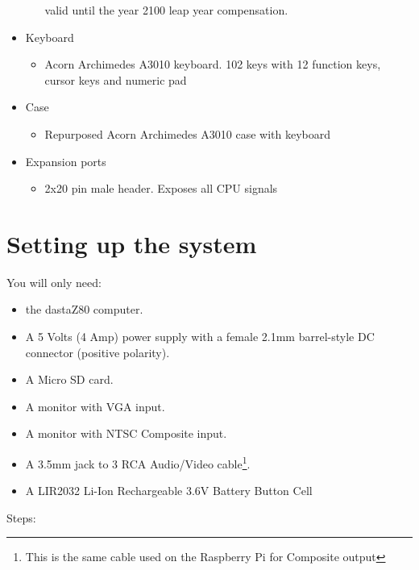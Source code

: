 \documentclass[a4paper,11pt]{article}
\begin{document}
\begin{itemize}
\begin{itemize}
            valid until the year 2100 leap year compensation.
        \end{itemize}
        \item Keyboard
        \begin{itemize}
            \item Acorn Archimedes A3010 keyboard. 102 keys with 12 function
            keys, cursor keys and numeric pad
        \end{itemize}
        \item Case
        \begin{itemize}
            \item Repurposed Acorn Archimedes A3010 case with keyboard
        \end{itemize}
        \item Expansion ports
        \begin{itemize}
            \item 2x20 pin male header. Exposes all CPU signals
        \end{itemize}
    \end{itemize}

    \pagebreak
    \section{Setting up the system}
    You will only need:

    \begin{itemize}
        \item the dastaZ80 computer.
        \item A 5 Volts (4 Amp) power supply with a female 2.1mm barrel-style DC
        connector (positive polarity).
        \item A Micro SD card.
        \item A monitor with VGA input.
        \item A monitor with NTSC Composite input.
        \item A 3.5mm jack to 3 RCA Audio/Video cable\footnote{This is the same
        cable used on the Raspberry Pi for Composite output}.
        \item A LIR2032 Li-Ion Rechargeable 3.6V Battery Button Cell
    \end{itemize}

    Steps:
\end{document}
